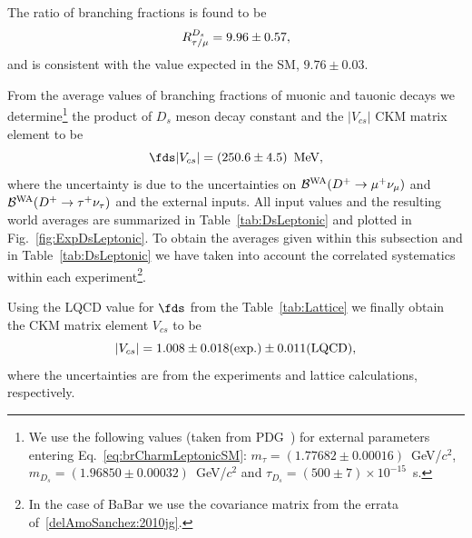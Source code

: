The ratio of branching fractions is found to be
\[
R_{\tau/\mu}^{D_{s}} = 9.96\pm0.57,
\]
and is consistent with the value expected in the SM, $9.76\pm0.03$.

From the average values of branching fractions of muonic and tauonic decays we determine\footnote{
We use the following values (taken from PDG~\cite{PDG_2012}) for external parameters entering 
Eq.~\ref{eq:brCharmLeptonicSM}: $m_{\tau} = (1.77682\pm0.00016)$~GeV/$c^2$, $m_{D_s} = (1.96850\pm0.00032)$~GeV/$c^2$ 
and $\tau_{D_s} = (500\pm7)\times 10^{-15}$~s.} the product of $D_s$ meson decay constant and 
the $|V_{cs}|$ CKM matrix element to be
\begin{equation}
 \fds|V_{cs}|=\left(250.6\pm4.5\right)~\mbox{MeV},
 \label{eq:expFDSVCS}
\end{equation}
where the uncertainty is due to the uncertainties on ${\cal B}^{\rm WA}(D^+\to\mu^+\nu_{\mu})$ and 
${\cal B}^{\rm WA}(D^+\to\tau^+\nu_{\tau})$ and the external inputs. All input values and the resulting world averages are 
summarized in Table~\ref{tab:DsLeptonic} and plotted in Fig.~\ref{fig:ExpDsLeptonic}. To obtain the 
averages given within this subsection and in Table~\ref{tab:DsLeptonic} we have taken into account
the correlated systematics within each experiment\footnote{In the case of BaBar we use the covariance matrix from the errata of~\ref{delAmoSanchez:2010jg}.}.

Using the LQCD value for $\fds$ from the Table~\ref{tab:Lattice} we 
finally obtain the CKM matrix element $V_{cs}$ to be
\[
 |V_{cs}| = 1.008\pm0.018(\rm exp.)\pm0.011(\rm LQCD),
\]
where the uncertainties are from the experiments and lattice calculations, respectively.

